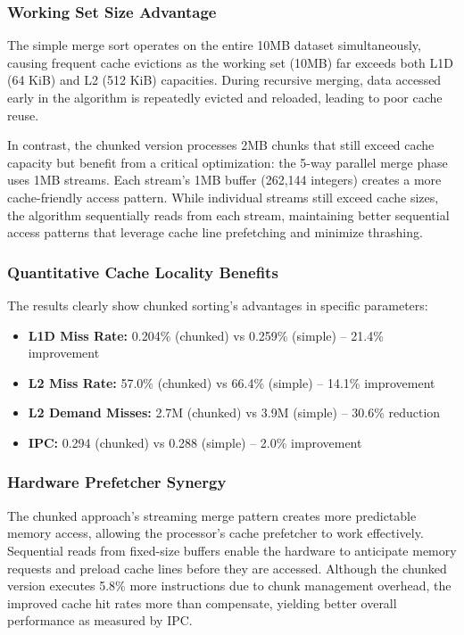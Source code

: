 \documentclass[12pt,a4paper]{article}
\begin{document}
\subsubsection{Working Set Size Advantage}

The simple merge sort operates on the entire 10MB dataset simultaneously, causing frequent cache evictions as the working set (10MB) far exceeds both L1D (64 KiB) and L2 (512 KiB) capacities. During recursive merging, data accessed early in the algorithm is repeatedly evicted and reloaded, leading to poor cache reuse.

In contrast, the chunked version processes 2MB chunks that still exceed cache capacity but benefit from a critical optimization: the 5-way parallel merge phase uses 1MB streams. Each stream's 1MB buffer (262,144 integers) creates a more cache-friendly access pattern. While individual streams still exceed cache sizes, the algorithm sequentially reads from each stream, maintaining better sequential access patterns that leverage cache line prefetching and minimize thrashing.

\subsubsection{Quantitative Cache Locality Benefits}

The results clearly show chunked sorting's advantages in specific parameters:

\begin{itemize}
    \item \textbf{L1D Miss Rate:} 0.204\% (chunked) vs 0.259\% (simple) -- 21.4\% improvement
    \item \textbf{L2 Miss Rate:} 57.0\% (chunked) vs 66.4\% (simple) -- 14.1\% improvement
    \item \textbf{L2 Demand Misses:} 2.7M (chunked) vs 3.9M (simple) -- 30.6\% reduction
    \item \textbf{IPC:} 0.294 (chunked) vs 0.288 (simple) -- 2.0\% improvement
\end{itemize}

\subsubsection{Hardware Prefetcher Synergy}

The chunked approach's streaming merge pattern creates more predictable memory access, allowing the processor's cache prefetcher to work effectively. Sequential reads from fixed-size buffers enable the hardware to anticipate memory requests and preload cache lines before they are accessed. Although the chunked version executes 5.8\% more instructions due to chunk management overhead, the improved cache hit rates more than compensate, yielding better overall performance as measured by IPC.
\end{document}
